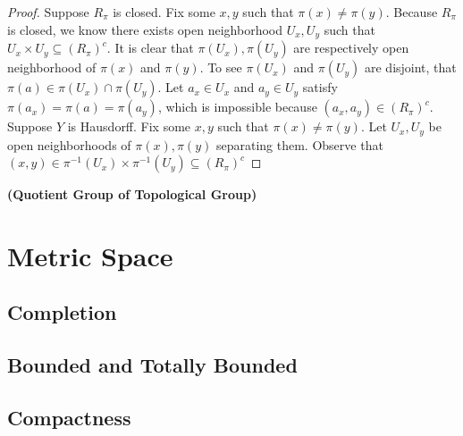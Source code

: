 \documentclass{report}
\begin{document}
\begin{proof}
  Suppose $R_\pi$ is closed. Fix some $x,y$ such that $\pi (x)\neq \pi (y)$. Because $R_\pi$ is closed, we know there exists open neighborhood $U_x,U_y$ such that $U_x \times U_y \subseteq (R_\pi)^c$. It is clear that $\pi (U_x),\pi (U_y)$ are respectively open neighborhood of $\pi (x)$ and $\pi (y)$. To see $\pi (U_x)$ and $\pi (U_y)$ are disjoint,  that $\pi (a)\in \pi (U_x)\cap \pi (U_y)$. Let $a_x\in U_x$ and $a_y\in U_y$ satisfy $\pi (a_x)=\pi (a)=\pi (a_y)$, which is impossible because $(a_x,a_y)\in (R_\pi)^c$. \CaC\\


Suppose $Y$ is Hausdorff. Fix some  $x,y$ such that  $\pi (x)\neq \pi (y)$. Let $U_x,U_y$ be open neighborhoods of  $\pi (x),\pi (y)$ separating them. Observe that $(x,y)\in \pi^{-1}(U_x)\times \pi^{-1}(U_y)\subseteq (R_\pi)^c$
\end{proof}
\begin{theorem}
\label{Quotient Group of Topological Group}
\textbf{(Quotient Group of Topological Group)}
\end{theorem}
\chapter{Metric Space}
\section{Completion}
\section{Bounded and Totally Bounded}
\section{Compactness}
\end{document}
